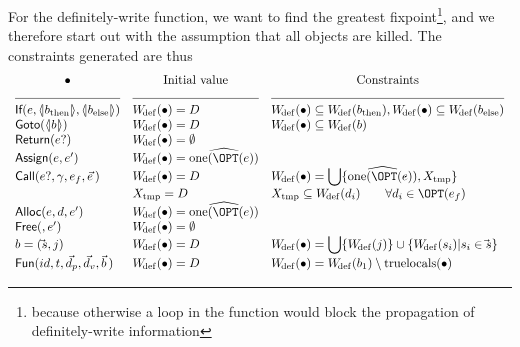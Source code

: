 \begin{docpart}
For the definitely-write function, we want to find the greatest
fixpoint\footnote
	{because otherwise a loop in the function would block
	the propagation of definitely-write information},
and we therefore start out with the assumption that all
objects are killed. The constraints generated are thus
\[
\begin{array}{lll}
  \hfil \bullet & \hfil \mbox{Initial value} & \hfil \mbox{Constraints} \\
  \hrulefill & \hrulefill & \hrulefill \\
  \cons{If}(e,\coreXref{b_{\mathrm{then}}},
  \coreXref{b_{\mathrm{else}}}) & \Wdef(\bullet) = D & \Wdef(\bullet) \subseteq
  \Wdef(b_{\mathrm{then}}) ,\hfil \Wdef(\bullet) \subseteq
  \Wdef(b_{\mathrm{else}}) \\
  \cons{Goto}(\coreXref b) & \Wdef(\bullet) = D & \Wdef(\bullet) \subseteq \Wdef(b) \\
  \cons{Return}(e?) & \Wdef(\bullet) = \emptyset &  \\
  \cons{Assign}(e,e') & \Wdef(\bullet) = \subdecl{\exactlyone(\OPT(e))} & \\
  \cons{Call}(e?,\gamma,e_f,\vec e\,)
  & \Wdef(\bullet) = D
  & \Wdef(\bullet) = {\displaystyle \bigcup} \{
  \subdecl{\exactlyone(\OPT(e))}, X_{\mathrm{tmp}} \} \\
  & X_{\mathrm{tmp}} = D & X_{\mathrm{tmp}} \subseteq \Wdef(d_i)
  \qquad \forall d_i \in \OPT(e_f)  \\
  \cons{Alloc}(e,d,e') & \Wdef(\bullet) = \subdecl{\exactlyone(\OPT(e))} \\ 
  \cons{Free}(,e') & \Wdef(\bullet) = \emptyset \\
  b = (\vec s,j) & \Wdef(\bullet) = D & \Wdef(\bullet) =
  {\displaystyle \bigcup} \{ \Wdef(j) \} \cup \{ \Wdef(s_i) |
  s_i \in \vec s \}  \\
  \cons{Fun}(id,t,\vec d_p,\vec d_v,\vec b\,)
  & \Wdef(\bullet) = D & \Wdef(\bullet) = \Wdef(b_1) \setminus
  \trulylocal(\bullet) \\
\end{array}
\]


\end{docpart}
